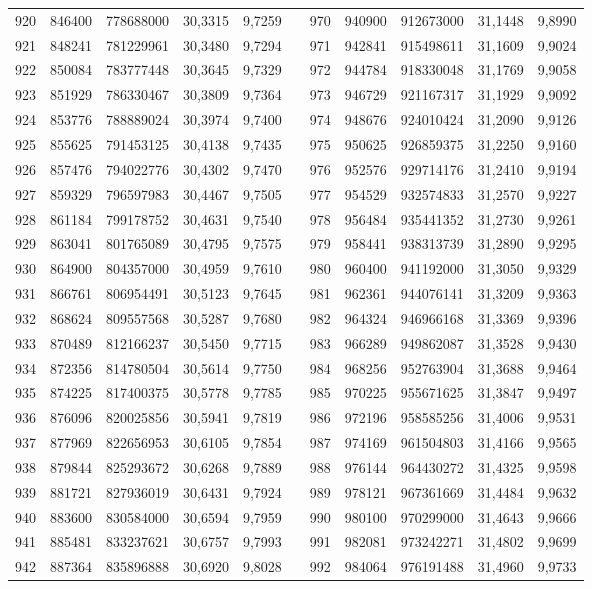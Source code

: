 \begin{longtable}{rrrrrrrrrrr}
920&846400&778688000&30,3315&9,7259&&970&940900&912673000&31,1448&9,8990\\
921&848241&781229961&30,3480&9,7294&&971&942841&915498611&31,1609&9,9024\\
922&850084&783777448&30,3645&9,7329&&972&944784&918330048&31,1769&9,9058\\
923&851929&786330467&30,3809&9,7364&&973&946729&921167317&31,1929&9,9092\\
924&853776&788889024&30,3974&9,7400&&974&948676&924010424&31,2090&9,9126\\
925&855625&791453125&30,4138&9,7435&&975&950625&926859375&31,2250&9,9160\\
926&857476&794022776&30,4302&9,7470&&976&952576&929714176&31,2410&9,9194\\
927&859329&796597983&30,4467&9,7505&&977&954529&932574833&31,2570&9,9227\\
928&861184&799178752&30,4631&9,7540&&978&956484&935441352&31,2730&9,9261\\
929&863041&801765089&30,4795&9,7575&&979&958441&938313739&31,2890&9,9295\\
930&864900&804357000&30,4959&9,7610&&980&960400&941192000&31,3050&9,9329\\
931&866761&806954491&30,5123&9,7645&&981&962361&944076141&31,3209&9,9363\\
932&868624&809557568&30,5287&9,7680&&982&964324&946966168&31,3369&9,9396\\
933&870489&812166237&30,5450&9,7715&&983&966289&949862087&31,3528&9,9430\\
934&872356&814780504&30,5614&9,7750&&984&968256&952763904&31,3688&9,9464\\
935&874225&817400375&30,5778&9,7785&&985&970225&955671625&31,3847&9,9497\\
936&876096&820025856&30,5941&9,7819&&986&972196&958585256&31,4006&9,9531\\
937&877969&822656953&30,6105&9,7854&&987&974169&961504803&31,4166&9,9565\\
938&879844&825293672&30,6268&9,7889&&988&976144&964430272&31,4325&9,9598\\
939&881721&827936019&30,6431&9,7924&&989&978121&967361669&31,4484&9,9632\\
940&883600&830584000&30,6594&9,7959&&990&980100&970299000&31,4643&9,9666\\
941&885481&833237621&30,6757&9,7993&&991&982081&973242271&31,4802&9,9699\\
942&887364&835896888&30,6920&9,8028&&992&984064&976191488&31,4960&9,9733\\

\end{longtable}
